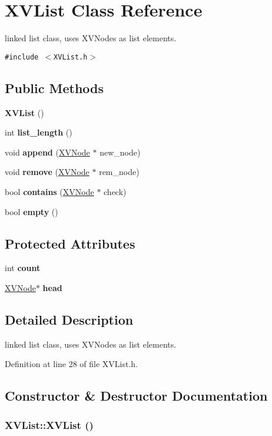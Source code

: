 \hypertarget{class_XVList}{
\section{XVList  Class Reference}
\label{XVList}
}
linked list class, uses XVNodes as list elements. 


{\tt \#include $<$XVList.h$>$}

\subsection*{Public Methods}
\begin{CompactItemize}
\item 
{\bf XVList} ()
\item 
int {\bf list\_\-length} ()
\item 
void {\bf append} (\hyperlink{class_XVNode}{XVNode} $\ast$ new\_\-node)
\item 
void {\bf remove} (\hyperlink{class_XVNode}{XVNode} $\ast$ rem\_\-node)
\item 
bool {\bf contains} (\hyperlink{class_XVNode}{XVNode} $\ast$ check)
\item 
bool {\bf empty} ()
\end{CompactItemize}
\subsection*{Protected Attributes}
\begin{CompactItemize}
\item 
int {\bf count}
\item 
\hyperlink{class_XVNode}{XVNode}$\ast$ {\bf head}
\end{CompactItemize}


\subsection{Detailed Description}
linked list class, uses XVNodes as list elements.





Definition at line 28 of file XVList.h.

\subsection{Constructor \& Destructor Documentation}
\label{XVList_a0}
\hypertarget{class_XVList_a0}{
\subsubsection[XVList]{\setlength{\rightskip}{0pt plus 5cm}XVList::XVList ()}}




